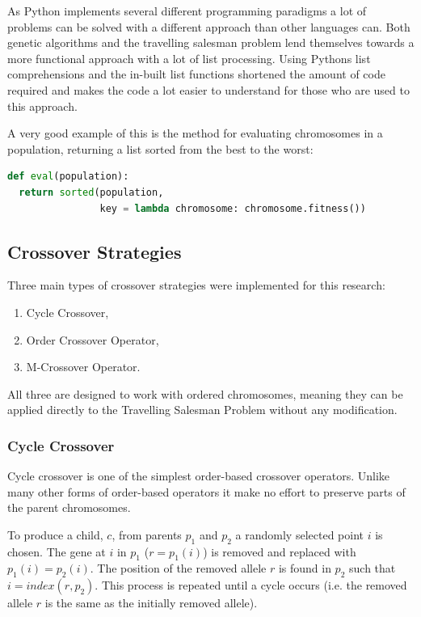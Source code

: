 \documentclass[10pt, a4paper]{article}
\begin{document}
As Python implements several different programming paradigms a lot of problems
can be solved with a different approach than other languages can. Both genetic
algorithms and the travelling salesman problem lend themselves towards a more
functional approach with a lot of list processing. Using Pythons list
comprehensions and the in-built list functions shortened the amount of code 
required and makes the code a lot easier to understand for those who are used 
to this approach.

A very good example of this is the method for evaluating chromosomes in a
population, returning a list sorted from the best to the worst:

\begin{lstlisting}[language=Python, 
                   caption=Using function elements to improve sustinctness and
                           readability]
def eval(population):
  return sorted(population, 
                key = lambda chromosome: chromosome.fitness())
\end{lstlisting}


\subsection{Crossover Strategies}

Three main types of crossover strategies were implemented for this research:

\begin{enumerate}
\item Cycle Crossover,
\item Order Crossover Operator,
\item M-Crossover Operator.
\end{enumerate}

All three are designed to work with ordered chromosomes, meaning they can be
applied directly to the Travelling Salesman Problem without any modification.

\subsubsection{Cycle Crossover}

Cycle crossover is one of the simplest order-based crossover operators. Unlike
many other forms of order-based operators it make no effort to preserve parts 
of the parent chromosomes.

To produce a child, $c$, from parents $p_1$ and $p_2$ a randomly selected point
$i$ is chosen. The gene at $i$ in $p_1$ ($r = p_1(i)$) is removed and replaced 
with $p_1(i) = p_2(i)$. The position of the removed allele $r$ is found in 
$p_2$ such that $i = index(r, p_2)$. This process is repeated until a cycle
occurs (i.e. the removed allele $r$ is the same as the initially removed 
allele).
\end{document}
